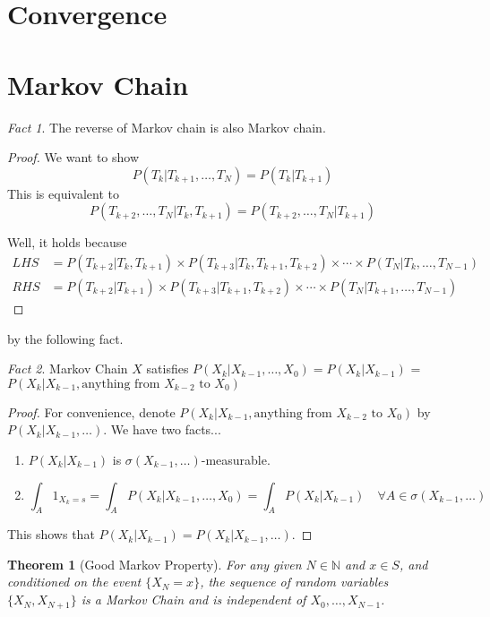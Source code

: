 \documentclass[11pt,reqno]{amsart}
\newtheorem{theorem}{Theorem}
\theoremstyle{remark}
\newtheorem{fact}{Fact}
\begin{document}
\section{Convergence}

\section{Markov Chain}
\begin{fact}
The reverse of Markov chain is also Markov chain.
\end{fact}
\begin{proof}
We want to show
\[
P(T_k | T_{k+1}, \ldots, T_N) = P(T_k | T_{k+1})
\]
This is equivalent to
\[
P(T_{k+2}, \ldots, T_N | T_k, T_{k+1}) = P(T_{k+2}, \ldots, T_N | T_{k+1})
\]

Well, it holds because
\[
\begin{aligned}
LHS &= P(T_{k+2} | T_k, T_{k+1}) \times P(T_{k+3} | T_k, T_{k+1}, T_{k+2}) \times \cdots \times P(T_N | T_k, \ldots, T_{N-1}) \\
RHS &= P(T_{k+2} | T_{k+1}) \times P(T_{k+3} | T_{k+1}, T_{k+2}) \times \cdots \times P(T_N | T_{k+1}, \ldots, T_{N-1})
\end{aligned}
\]
\end{proof}

by the following fact. 


\begin{fact}
Markov Chain \( X \) satisfies \( P(X_k | X_{k-1}, \ldots, X_0) = P(X_k | X_{k-1}) \) = \( P(X_k | X_{k-1}, \text{anything from } X_{k-2} \text{ to } X_0) \)
\end{fact}

\begin{proof}
For convenience, denote \( P(X_k | X_{k-1}, \text{anything from } X_{k-2} \text{ to } X_0) \) by \( P(X_k | X_{k-1}, \ldots) \). We have two facts...
\begin{enumerate}
\item \( P(X_k | X_{k-1}) \) is \( \sigma(X_{k-1}, \ldots) \)-measurable.
\item 
\[
\int_A 1_{X_k = s} = \int_A P(X_k | X_{k-1}, \ldots, X_0) = \int_A P(X_k | X_{k-1}) \quad \forall A \in \sigma(X_{k-1}, \ldots)
\]
\end{enumerate}
This shows that \( P(X_k | X_{k-1}) = P(X_k | X_{k-1}, \ldots) \).
\end{proof}

\begin{theorem}[Good Markov Property]
For any given \( N \in \mathbb{N} \) and \( x \in S \), and conditioned on the event \( \{X_N = x\} \), the sequence of random variables \( \{X_N, X_{N+1}\} \) is a Markov Chain and is independent of \( X_0, \ldots, X_{N-1} \).
\end{theorem}
\end{document}
